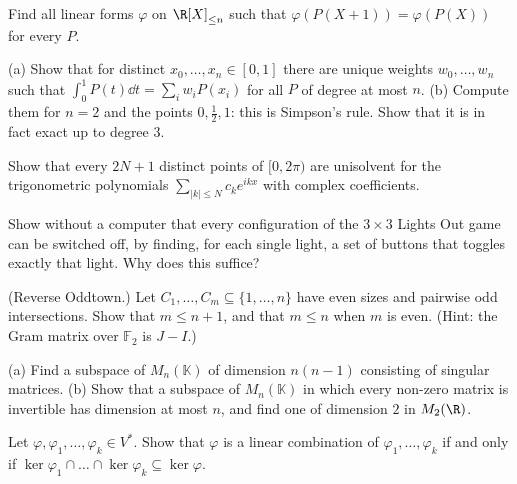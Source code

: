 \begin{exercise}[$\star\star$]\label{ex:shift}
Find all linear forms $\varphi$ on $\R[X]_{\le n}$ such that $\varphi(P(X+1))=\varphi(P(X))$ for every $P$.
\end{exercise}

\begin{exercise}[$\star\star$]\label{ex:quadrature}
(a) Show that for distinct $x_0,\dots,x_n\in[0,1]$ there are unique weights $w_0,\dots,w_n$ such that
$\int_0^1P(t)\dd t=\sum_iw_iP(x_i)$ for all $P$ of degree at most $n$. (b) Compute them for $n=2$ and the points
$0,\frac12,1$: this is Simpson's rule. Show that it is in fact exact up to degree $3$.
\end{exercise}

\begin{exercise}[$\star$]\label{ex:trig}
Show that every $2N+1$ distinct points of $[0,2\pi)$ are unisolvent for the trigonometric polynomials
$\sum_{|k|\le N}c_ke^{ikx}$ with complex coefficients.
\end{exercise}

\begin{exercise}[$\star\star$]\label{ex:lights3}
Show without a computer that every configuration of the $3\times3$ Lights Out game can be switched off, by finding, for
each single light, a set of buttons that toggles exactly that light. Why does this suffice?
\end{exercise}

\begin{exercise}[$\star\star$]\label{ex:eventown}
(Reverse Oddtown.) Let $C_1,\dots,C_m\subseteq\{1,\dots,n\}$ have even sizes and pairwise odd intersections. Show that
$m\le n+1$, and that $m\le n$ when $m$ is even. (Hint: the Gram matrix over $\mathbb F_2$ is $J-I$.)
\end{exercise}

\begin{exercise}[$\star\star$]\label{ex:singularspace}
(a) Find a subspace of $M_n(\mathbb K)$ of dimension $n(n-1)$ consisting of singular matrices. (b) Show that a subspace
of $M_n(\mathbb K)$ in which every non-zero matrix is invertible has dimension at most $n$, and find one of dimension $2$
in $M_2(\R)$.
\end{exercise}

\begin{exercise}[$\star\star$]\label{ex:hyperplanes}
Let $\varphi,\varphi_1,\dots,\varphi_k\in V^*$. Show that $\varphi$ is a linear combination of $\varphi_1,\dots,\varphi_k$ if and only if
$\ker\varphi_1\cap\dots\cap\ker\varphi_k\subseteq\ker\varphi$.
\end{exercise}

